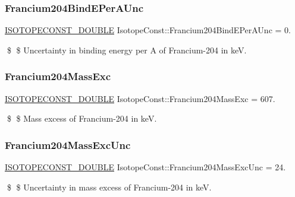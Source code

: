 \subsubsection{\texorpdfstring{Francium204\+Bind\+E\+Per\+A\+Unc}{Francium204BindEPerAUnc}}
{\footnotesize\ttfamily \mbox{\hyperlink{group___isotope_const-_macros_ga8f45a7272ce02c0b4c65c44636ed719a}{I\+S\+O\+T\+O\+P\+E\+C\+O\+N\+S\+T\+\_\+\+D\+O\+U\+B\+LE}} Isotope\+Const\+::\+Francium204\+Bind\+E\+Per\+A\+Unc = 0.}

\$ \$ Uncertainty in binding energy per A of Francium-\/204 in keV. \mbox{\label{group___isotope_const-_francium-_fr204_ga733b7dbc7a178035b311d92e106af8dd}} 
\subsubsection{\texorpdfstring{Francium204\+Mass\+Exc}{Francium204MassExc}}
{\footnotesize\ttfamily \mbox{\hyperlink{group___isotope_const-_macros_ga8f45a7272ce02c0b4c65c44636ed719a}{I\+S\+O\+T\+O\+P\+E\+C\+O\+N\+S\+T\+\_\+\+D\+O\+U\+B\+LE}} Isotope\+Const\+::\+Francium204\+Mass\+Exc = 607.}

\$ \$ Mass excess of Francium-\/204 in keV. \mbox{\label{group___isotope_const-_francium-_fr204_ga1ad3d08a1bd6651dc48a1a68e3de099a}} 
\subsubsection{\texorpdfstring{Francium204\+Mass\+Exc\+Unc}{Francium204MassExcUnc}}
{\footnotesize\ttfamily \mbox{\hyperlink{group___isotope_const-_macros_ga8f45a7272ce02c0b4c65c44636ed719a}{I\+S\+O\+T\+O\+P\+E\+C\+O\+N\+S\+T\+\_\+\+D\+O\+U\+B\+LE}} Isotope\+Const\+::\+Francium204\+Mass\+Exc\+Unc = 24.}

\$ \$ Uncertainty in mass excess of Francium-\/204 in keV. \mbox{\label{group___isotope_const-_francium-_fr204_gaba73bd9bc4442ba3e2874429c4d20bb7}} 
